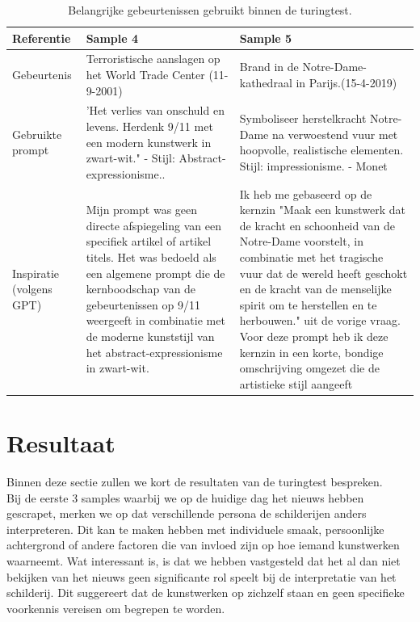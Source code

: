 \begin{table}[htbp]
\begin{tabular}{|p{2cm}|p{5.3cm}|p{5.3cm}|}
        \hline
        \textbf{Referentie} &  \textbf{Sample 4} & \textbf{Sample 5} \\
        \hline
        Gebeurtenis &Terroristische aanslagen op het World Trade Center (11-9-2001) &  Brand in de Notre-Dame-kathedraal in Parijs.(15-4-2019) \\
        \hline
        Gebruikte prompt & 'Het verlies van onschuld en levens. Herdenk 9/11 met een modern kunstwerk in zwart-wit." - Stijl: Abstract-expressionisme.. & Symboliseer herstelkracht Notre-Dame na verwoestend vuur met hoopvolle, realistische elementen. Stijl: impressionisme. - Monet \\
        \hline
        Inspiratie (volgens GPT) & Mijn prompt was geen directe afspiegeling van een specifiek artikel of artikel titels. Het was bedoeld als een algemene prompt die de kernboodschap van de gebeurtenissen op 9/11 weergeeft in combinatie met de moderne kunststijl van het abstract-expressionisme in zwart-wit.& Ik heb me gebaseerd op de kernzin "Maak een kunstwerk dat de kracht en schoonheid van de Notre-Dame voorstelt, in combinatie met het tragische vuur dat de wereld heeft geschokt en de kracht van de menselijke spirit om te herstellen en te herbouwen." uit de vorige vraag. Voor deze prompt heb ik deze kernzin in een korte, bondige omschrijving omgezet die de artistieke stijl aangeeft \\
        \hline
    \end{tabular}
    \caption{Belangrijke gebeurtenissen gebruikt binnen de turingtest.}
    \label{table:events_samples}
\end{table}
\pagebreak
\section{Resultaat}
\label{section:result}
Binnen deze sectie zullen we kort de resultaten van de turingtest bespreken. \\

Bij de eerste 3 samples waarbij we op de huidige dag het nieuws hebben gescrapet, merken we op dat verschillende persona de schilderijen anders interpreteren. Dit kan te maken hebben met individuele smaak, persoonlijke achtergrond of andere factoren die van invloed zijn op hoe iemand kunstwerken waarneemt. Wat interessant is, is dat we hebben vastgesteld dat het al dan niet bekijken van het nieuws geen significante rol speelt bij de interpretatie van het schilderij. Dit suggereert dat de kunstwerken op zichzelf staan en geen specifieke voorkennis vereisen om begrepen te worden. \\

